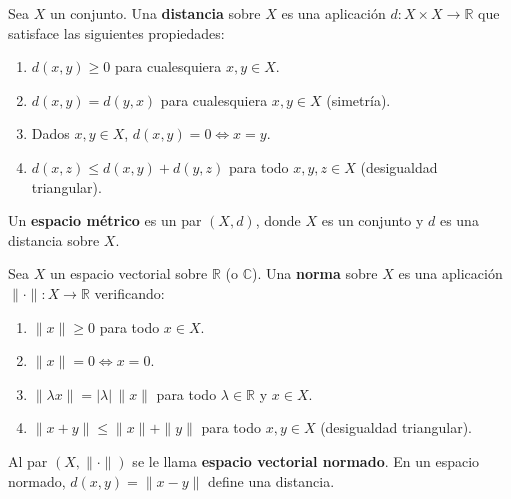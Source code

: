 \begin{definición}
    Sea $X$ un conjunto. Una \textbf{distancia} sobre $X$ es una aplicación $d: X \times X \to \mathbb{R}$ que satisface las siguientes propiedades:
    \begin{enumerate}
        \item $d(x, y) \geq 0$ para cualesquiera $x, y \in X$.
        \item $d(x, y) = d(y, x)$ para cualesquiera $x, y \in X$ \textnormal{(simetría)}.
        \item Dados $x, y \in X$, $d(x, y) = 0 \iff x = y$.
        \item $d(x, z) \leq d(x, y) + d(y, z)$ para todo $x, y, z \in X$ \textnormal{(desigualdad triangular)}.
    \end{enumerate}
    Un \textbf{espacio métrico} es un par $(X, d)$, donde $X$ es un conjunto y $d$ es una distancia sobre $X$.
\end{definición}




\begin{definición}
    Sea $X$ un espacio vectorial sobre $\mathbb{R}$ (o $\mathbb{C}$). Una \textbf{norma} sobre $X$ es una aplicación $\|\cdot\| : X \to \mathbb{R}$ verificando:
    \begin{enumerate}
        \item $\|x\| \geq 0$ para todo $x \in X$.
        \item $\|x\| = 0 \iff x = 0$.
        \item $\|\lambda x\| = |\lambda|\,\|x\|$ para todo $\lambda \in \mathbb{R}$ y $x \in X$.
        \item $\|x + y\| \leq \|x\| + \|y\|$ para todo $x, y \in X$ (desigualdad triangular).
    \end{enumerate}
    Al par $(X, \|\cdot\|)$ se le llama \textbf{espacio vectorial normado}. En un espacio normado, $d(x, y) = \|x - y\|$ define una distancia.
\end{definición}

